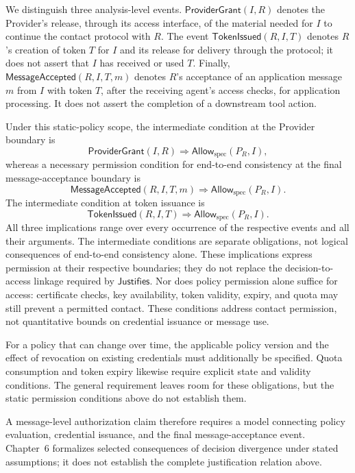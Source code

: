 We distinguish three analysis-level events.
$\mathsf{ProviderGrant}(I,R)$ denotes the Provider's release, through its
access interface, of the material needed for $I$ to continue the contact
protocol with $R$. The event $\mathsf{TokenIssued}(R,I,T)$ denotes $R$'s
creation of token $T$ for $I$ and its release for delivery through the
protocol; it does not assert that $I$ has received or used $T$.
Finally, $\mathsf{MessageAccepted}(R,I,T,m)$ denotes $R$'s acceptance of an
application message $m$ from $I$ with token $T$, after the receiving agent's
access checks, for application processing. It does not assert the completion
of a downstream tool action.

Under this static-policy scope, the intermediate condition at the Provider
boundary is
\[
  \mathsf{ProviderGrant}(I,R)
  \Longrightarrow \mathsf{Allow}_{\mathrm{spec}}(P_R,I),
\]
whereas a necessary permission condition for end-to-end consistency at the
final message-acceptance boundary is
\[
  \mathsf{MessageAccepted}(R,I,T,m)
  \Longrightarrow \mathsf{Allow}_{\mathrm{spec}}(P_R,I).
\]
The intermediate condition at token issuance is
\[
  \mathsf{TokenIssued}(R,I,T)
  \Longrightarrow \mathsf{Allow}_{\mathrm{spec}}(P_R,I).
\]
All three implications range over every occurrence of the respective events
and all their arguments. The intermediate conditions are separate obligations,
not logical consequences of end-to-end consistency alone. These implications
express permission at their respective boundaries; they do not replace the
decision-to-access linkage required by
$\mathsf{Justifies}$. Nor does policy permission alone suffice for access:
certificate checks, key availability, token validity, expiry, and quota may
still prevent a permitted contact. These conditions address contact
permission, not quantitative bounds on credential issuance or message use.

For a policy that can change over time, the applicable policy version and the
effect of revocation on existing credentials must additionally be specified.
Quota consumption and token expiry likewise require explicit state and
validity conditions. The general requirement leaves room for these
obligations, but the static permission conditions above do not establish them.

A message-level authorization claim therefore requires a model connecting
policy evaluation, credential issuance, and the final message-acceptance event.
Chapter~6 formalizes selected consequences of decision divergence under stated
assumptions; it does not establish the complete justification relation above.

